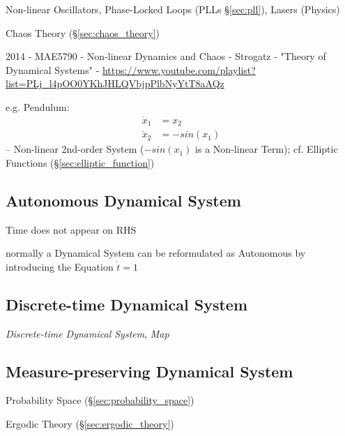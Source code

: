 Non-linear Oscillators, Phase-Locked Loops (PLLs \S\ref{sec:pll}), Lasers
(Physics)

\fist Chaos Theory (\S\ref{sec:chaos_theory})

2014 - MAE5790 - Non-linear Dynamics and Chaos - Strogatz - "Theory of
Dynamical Systems" -
\url{https://www.youtube.com/playlist?list=PLj_l4pOO0YKhJHLQVbjpPlbNyYtT8aAQz}

e.g. Pendulum:
\begin{align*}
  \dot{x}_1 & = x_2 \\
  \dot{x}_2 & = -sin(x_1)
\end{align*}
-- Non-linear 2nd-order System ($-sin(x_1)$ is a Non-linear Term); cf. Elliptic
Functions
(\S\ref{sec:elliptic_function})



\subsection{Autonomous Dynamical System}\label{sec:autonomous_dynamical_system}

Time does not appear on RHS

normally a Dynamical System can be reformulated as Autonomous by introducing
the Equation $\dot{t} = 1$



\subsection{Discrete-time Dynamical System}\label{sec:discrete_dynamical_system}

\emph{Discrete-time Dynamical System}, \emph{Map}



\subsection{Measure-preserving Dynamical System}
\label{sec:measure_preserving_system}

Probability Space (\S\ref{sec:probability_space})

\fist Ergodic Theory (\S\ref{sec:ergodic_theory})

